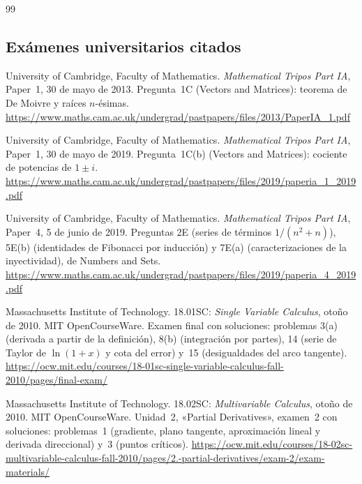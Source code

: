 \begin{thebibliography}{99}
\small

\subsection*{Exámenes universitarios citados}

University of Cambridge, Faculty of Mathematics.
\newblock \emph{Mathematical Tripos Part IA}, Paper~1, 30 de mayo de 2013.
\newblock Pregunta~1C (Vectors and Matrices): teorema de De Moivre y raíces $n$-ésimas.
\newblock \url{https://www.maths.cam.ac.uk/undergrad/pastpapers/files/2013/PaperIA_1.pdf}

University of Cambridge, Faculty of Mathematics.
\newblock \emph{Mathematical Tripos Part IA}, Paper~1, 30 de mayo de 2019.
\newblock Pregunta~1C(b) (Vectors and Matrices): cociente de potencias de $1\pm i$.
\newblock \url{https://www.maths.cam.ac.uk/undergrad/pastpapers/files/2019/paperia_1_2019.pdf}

University of Cambridge, Faculty of Mathematics.
\newblock \emph{Mathematical Tripos Part IA}, Paper~4, 5 de junio de 2019.
\newblock Preguntas 2E (series de términos $1/(n^{2}+n)$), 5E(b) (identidades de Fibonacci por inducción) y 7E(a) (caracterizaciones de la inyectividad), de Numbers and Sets.
\newblock \url{https://www.maths.cam.ac.uk/undergrad/pastpapers/files/2019/paperia_4_2019.pdf}

Massachusetts Institute of Technology.
\newblock 18.01SC: \emph{Single Variable Calculus}, otoño de 2010. MIT OpenCourseWare.
\newblock Examen final con soluciones: problemas 3(a) (derivada a partir de la definición), 8(b) (integración por partes), 14 (serie de Taylor de $\ln(1+x)$ y cota del error) y~15 (desigualdades del arco tangente).
\newblock \url{https://ocw.mit.edu/courses/18-01sc-single-variable-calculus-fall-2010/pages/final-exam/}

Massachusetts Institute of Technology.
\newblock 18.02SC: \emph{Multivariable Calculus}, otoño de 2010. MIT OpenCourseWare.
\newblock Unidad~2, «Partial Derivatives», examen~2 con soluciones: problemas~1 (gradiente, plano tangente, aproximación lineal y derivada direccional) y~3 (puntos críticos).
\newblock \url{https://ocw.mit.edu/courses/18-02sc-multivariable-calculus-fall-2010/pages/2.-partial-derivatives/exam-2/exam-materials/}


\end{thebibliography}
